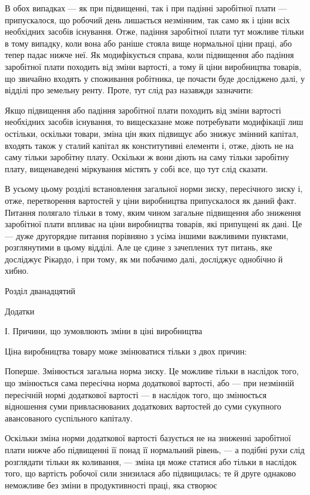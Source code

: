 \parcont{}  %
В обох випадках — як при підвищенні, так і при падінні заробітної плати — припускалося, що робочий
день лишається незмінним, так само як і ціни всіх необхідних засобів існування. Отже, падіння
заробітної плати тут можливе тільки в тому випадку, коли вона або раніше стояла вище нормальної ціни
праці, або тепер падає нижче неї. Як модифікується справа, коли підвищення або падіння заробітної
плати походить від зміни вартості, а тому й ціни виробництва товарів, що звичайно входять у
споживання робітника, це почасти буде досліджено далі, у відділі про земельну ренту. Проте, тут слід
раз назавжди зазначити:

Якщо підвищення або падіння заробітної плати походить від зміни вартості необхідних засобів
існування, то вищесказане може потребувати модифікації лиш остільки, оскільки товари, зміна цін яких
підвищує або знижує змінний капітал, входять також у сталий капітал як конститутивні елементи і,
отже, діють не на саму тільки заробітну плату. Оскільки ж вони діють на саму тільки заробітну плату,
вищенаведені міркування містять у собі все, що тут слід сказати.

В усьому цьому розділі встановлення загальної норми зиску, пересічного зиску і, отже, перетворення
вартостей у ціни виробництва припускалося як даний факт. Питання полягало тільки в тому, яким чином
загальне підвищення або зниження заробітної плати впливає на ціни виробництва товарів, які припущені
як дані. Це — дуже другорядне питання порівняно з усіма іншими важливими пунктами, розглянутими в
цьому відділі. Але
це єдине з зачеплених тут питань, яке досліджує Рікардо, і при тому, як ми побачимо далі, досліджує
однобічно й хибно.

Розділ дванадцятий

Додатки

І. Причини, що зумовлюють зміни в ціні виробництва

Ціна виробництва товару може змінюватися тільки з двох причин:

Поперше. Змінюється загальна норма зиску. Це можливе тільки в наслідок того, що змінюється сама
пересічна норма додаткової вартості, або — при незмінній пересічній нормі додаткової вартості — в
наслідок того, що змінюється відношення суми привласнюваних додаткових вартостей до суми сукупного
авансованого суспільного капіталу.

Оскільки зміна норми додаткової вартості базується не на зниженні заробітної плати нижче або
підвищенні її понад її нормальний рівень, — а подібні рухи слід розглядати тільки як коливання, —
зміна ця може статися або тільки в наслідок того, що вартість робочої сили знизилася або
підвищилась; те й друге однаково неможливе без зміни в продуктивності праці, яка створює
\parbreak{}  %
